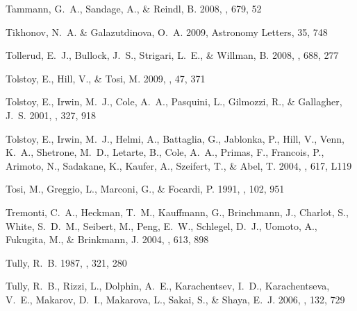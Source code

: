 \documentclass[manuscript]{aastex}
\begin{document}
\begin{thebibliography}{381}
{Tammann}, G.~A., {Sandage}, A., \& {Reindl}, B. 2008, \apj, 679, 52

{Tikhonov}, N.~A. \& {Galazutdinova}, O.~A. 2009, Astronomy Letters, 35, 748

{Tollerud}, E.~J., {Bullock}, J.~S., {Strigari}, L.~E., \& {Willman}, B. 2008,
  \apj, 688, 277

{Tolstoy}, E., {Hill}, V., \& {Tosi}, M. 2009, \araa, 47, 371

{Tolstoy}, E., {Irwin}, M.~J., {Cole}, A.~A., {Pasquini}, L., {Gilmozzi}, R.,
  \& {Gallagher}, J.~S. 2001, \mnras, 327, 918

{Tolstoy}, E., {Irwin}, M.~J., {Helmi}, A., {Battaglia}, G., {Jablonka}, P.,
  {Hill}, V., {Venn}, K.~A., {Shetrone}, M.~D., {Letarte}, B., {Cole}, A.~A.,
  {Primas}, F., {Francois}, P., {Arimoto}, N., {Sadakane}, K., {Kaufer}, A.,
  {Szeifert}, T., \& {Abel}, T. 2004, \apjl, 617, L119

{Tosi}, M., {Greggio}, L., {Marconi}, G., \& {Focardi}, P. 1991, \aj, 102, 951

{Tremonti}, C.~A., {Heckman}, T.~M., {Kauffmann}, G., {Brinchmann}, J.,
  {Charlot}, S., {White}, S.~D.~M., {Seibert}, M., {Peng}, E.~W., {Schlegel},
  D.~J., {Uomoto}, A., {Fukugita}, M., \& {Brinkmann}, J. 2004, \apj, 613, 898

{Tully}, R.~B. 1987, \apj, 321, 280

{Tully}, R.~B., {Rizzi}, L., {Dolphin}, A.~E., {Karachentsev}, I.~D.,
  {Karachentseva}, V.~E., {Makarov}, D.~I., {Makarova}, L., {Sakai}, S., \&
  {Shaya}, E.~J. 2006, \aj, 132, 729


\end{thebibliography}
\end{document}
